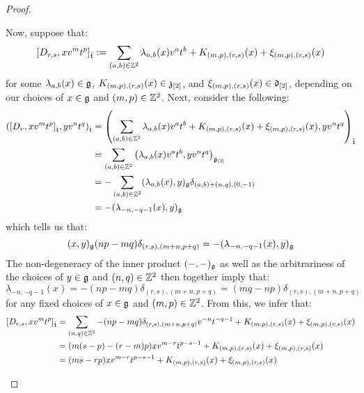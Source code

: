 \begin{proof}
\begin{enumerate}
                    Now, suppose that:
                        $$[D_{r, s}, x v^m t^p]_{\hat{\mathfrak{t}}} := \sum_{(a, b) \in \mathbb{Z}^2} \lambda_{a, b}(x) v^a t^b + K_{(m, p), (r, s)}(x) + \xi_{(m, p), (r, s)}(x)$$
                    for some $\lambda_{a, b}(x) \in \mathfrak{g}$, $K_{(m, p), (r, s)}(x) \in \mathfrak{z}_{[2]}$, and $\xi_{(m, p), (r, s)}(x) \in \mathfrak{d}_{[2]}$, depending on our choices of $x \in \mathfrak{g}$ and $(m, p) \in \mathbb{Z}^2$. Next, consider the following:
                        $$
                            \begin{aligned}
                                ( [D_v, x v^m t^p]_{\hat{\mathfrak{t}}}, y v^n t^q )_{\hat{\mathfrak{t}}} & = \left( \sum_{(a, b) \in \mathbb{Z}^2} \lambda_{a, b}(x) v^a t^b + K_{(m, p), (r, s)}(x) + \xi_{(m, p), (r, s)}(x), y v^n t^q \right)_{\hat{\mathfrak{t}}}
                                \\
                                & = \sum_{(a, b) \in \mathbb{Z}^2} \left( \lambda_{a, b}(x) v^a t^b, y v^n t^q \right)_{\mathfrak{g}_{[2]}}
                                \\
                                & = -\sum_{(a, b) \in \mathbb{Z}^2} (\lambda_{a, b}(x), y)_{\mathfrak{g}} \delta_{ (a, b) + (n, q), (0, -1) }
                                \\
                                & = -(\lambda_{-n, -q - 1}(x), y)_{\mathfrak{g}}
                            \end{aligned}
                        $$
                    which tells us that:
                        $$(x, y)_{\mathfrak{g}} (np - mq) \delta_{(r, s), (m + n, p + q)} = -(\lambda_{-n, -q - 1}(x), y)_{\mathfrak{g}}$$
                    The non-degeneracy of the inner product $(-, -)_{\mathfrak{g}}$ as well as the arbitrariness of the choices of $y \in \mathfrak{g}$ and $(n, q) \in \mathbb{Z}^2$ then together imply that:
                        $$\lambda_{-n, -q - 1}(x) = -(np - mq) \delta_{(r, s), (m + n, p + q)} = (mq - np) \delta_{(r, s), (m + n, p + q)}$$
                    for any fixed choices of $x \in \mathfrak{g}$ and $(m, p) \in \mathbb{Z}^2$. From this, we infer that:
                        $$
                            \begin{aligned}
                                [D_{r, s}, x v^m t^p]_{\extendedtoroidal} & = \sum_{(n, q) \in \Z^2} -(np - mq) \delta_{(r, s), (m + n, p + q)} v^{-n} t^{-q - 1} + K_{(m, p), (r, s)}(x) + \xi_{(m, p), (r, s)}(x)
                                \\
                                & = ( m(s - p) - (r - m)p ) x v^{m - r} t^{p - s - 1} + K_{(m, p), (r, s)}(x) + \xi_{(m, p), (r, s)}(x)
                                \\
                                & = ( ms - rp ) x v^{m - r} t^{p - s - 1} + K_{(m, p), (r, s)}(x) + \xi_{(m, p), (r, s)}(x)
                            \end{aligned}
                        $$
                        

\end{enumerate}
\end{proof}
